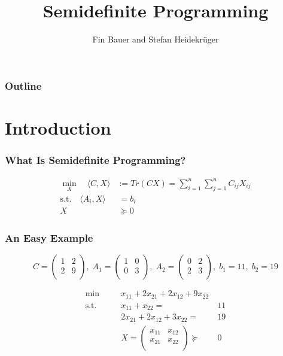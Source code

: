 \documentclass[11pt]{beamer}
\author{Fin Bauer and Stefan Heidekrüger}
\title{Semidefinite Programming}
\begin{document}
	\maketitle
\begin{frame}
	\frametitle{Outline}
	\tableofcontents
\end{frame}
\section{Introduction}	
	\begin{frame}
		\frametitle{What Is Semidefinite Programming?}
	\begin{block}{\vspace*{-3ex}}
		\begin{equation}
		\begin{aligned}
		\min_X \quad\langle C,X \rangle &:= Tr(CX)=\sum_{i=1}^{n}\sum_{j=1}^{n}C_{ij}X_{ij}\\
		\text{s.t.}\quad\langle A_i,X\rangle&\:= b_i\\
		X&\:\succeq 0
		\end{aligned}
		\end{equation}
	\end{block}
	\end{frame}
	\begin{frame}
		\frametitle{An Easy Example}
		\begin{equation*}
		C=\begin{pmatrix}
		1 & 2 \\
		2 & 9 \\
		\end{pmatrix},\; A_1=\begin{pmatrix}
		1 & 0 \\
		0 & 3 \\
		\end{pmatrix},\; A_2=\begin{pmatrix}
		0 & 2 \\
		2 & 3 \\
		\end{pmatrix},\; b_1=11,\; b_2=19
		\end{equation*}
		\pause
		\begin{block}{\vspace*{-3ex}}
		\begin{equation*}
		\begin{aligned}
		\min\quad && x_{11}+2x_{21}+2x_{12}+9x_{22}\\
		\text{s.t.}\quad&& x_{11}+x_{22}= & \:11\\
		&&  2x_{21}+2x_{12}+3x_{22}= & \:19\\
		&& X=\begin{pmatrix}
		x_{11}& x_{12}\\
		x_{21}& x_{22}\\
		\end{pmatrix}\succeq&\: 0
		\end{aligned}
		\end{equation*}
		\end{block}
	\end{frame}
\end{document}
